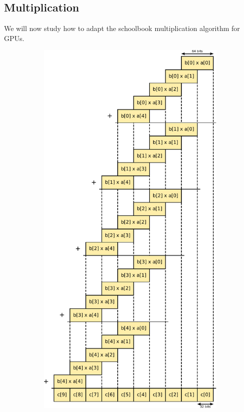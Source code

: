 \documentclass[12pt, a4paper]{report}
\begin{document}
\begin{sloppypar}
\subsection{Multiplication}
We will now study how to adapt the schoolbook multiplication algorithm for
GPUs.
\begin{figure}
        \centering
        \begin{subfigure}[h]{0.5\textwidth}
                \centering
                \includegraphics[width=\textwidth]{figs/multiplication}

\end{subfigure}
\end{figure}
\end{sloppypar}
\end{document}
